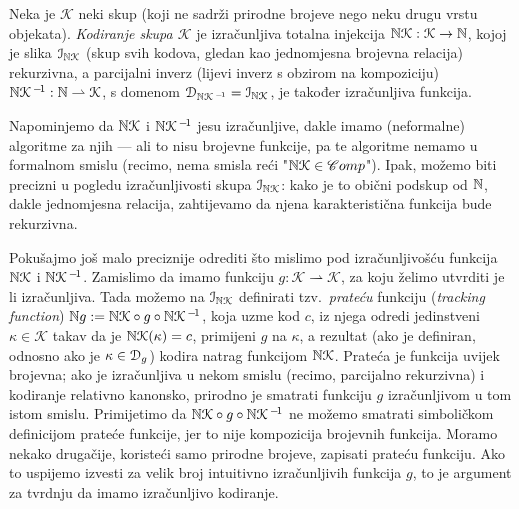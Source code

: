 \begin{definicija}[{name=[kodiranje]}]
	Neka je $\mathcal K$ neki skup (koji ne sadrži prirodne brojeve nego neku drugu vrstu objekata). \emph{Kodiranje skupa $\mathcal K$} je izračunljiva totalna injekcija ${\mathbb N}\mathcal K:\mathcal K\to{\mathbb N}$, kojoj je slika $\mathcal I_{{\mathbb N}\mathcal K}$ (skup svih kodova, gledan kao jednomjesna brojevna relacija) rekurzivna, a parcijalni inverz (lijevi inverz s obzirom na kompoziciju) ${\mathbb N}\mathcal K^{\,-\!1}:{\mathbb N}\rightharpoonup\mathcal K$, s domenom $\mathcal D_{{\mathbb N}\mathcal K^{\,-\!1}}=\mathcal I_{{\mathbb N}\mathcal K}$, je također izračunljiva funkcija.
\end{definicija}

Napominjemo da ${{\mathbb N}\mathcal K}$ i ${\mathbb N}\mathcal K^{\,-\!1}$ jesu izračunljive, dakle imamo (neformalne) algoritme za njih --- ali to nisu brojevne funkcije, pa te algoritme nemamo u formalnom smislu (recimo, nema smisla reći "${\mathbb N}\mathcal K\in\mathscr Comp$"). Ipak, možemo biti precizni u pogledu izračunljivosti skupa $\mathcal I_{{\mathbb N}\mathcal K}$: kako je to obični podskup od ${\mathbb N}$, dakle jednomjesna relacija, zahtijevamo da njena karakteristična funkcija bude rekurzivna.

Pokušajmo još malo preciznije odrediti što mislimo pod izračunljivošću funkcija ${{\mathbb N}\mathcal K}$ i ${\mathbb N}\mathcal K^{\,-\!1}$. Zamislimo da imamo funkciju $g:\mathcal K\rightharpoonup\mathcal K$, za koju želimo utvrditi je li izračunljiva. Tada možemo na $\mathcal I_{{\mathbb N}\mathcal K}$ definirati tzv.\ \emph{prateću} funkciju (\emph{tracking function}) ${\mathbb N} g:={{\mathbb N}\mathcal K}\circ g\circ{\mathbb N}\mathcal K^{\,-\!1}$, koja uzme kod $c$, iz njega odredi jedinstveni $\kappa\in\mathcal K$ takav da je ${{\mathbb N}\mathcal K}(\kappa)=c$, primijeni $g$ na $\kappa$, a rezultat (ako je definiran, odnosno ako je $\kappa\in\mathcal D_{g}$) kodira natrag funkcijom ${{\mathbb N}\mathcal K}$. Prateća je funkcija uvijek brojevna; ako je izračunljiva u nekom smislu (recimo, parcijalno rekurzivna) i kodiranje relativno kanonsko, prirodno je smatrati funkciju $g$ izračunljivom u tom istom smislu. Primijetimo da ${{\mathbb N}\mathcal K}\circ g\circ{\mathbb N}\mathcal K^{\,-\!1}$ ne možemo smatrati simboličkom definicijom prateće funkcije, jer to nije kompozicija brojevnih funkcija. Moramo nekako drugačije, koristeći samo prirodne brojeve, zapisati prateću funkciju. Ako to uspijemo izvesti za velik broj intuitivno izračunljivih funkcija $g$, to je argument za tvrdnju da imamo izračunljivo kodiranje.

